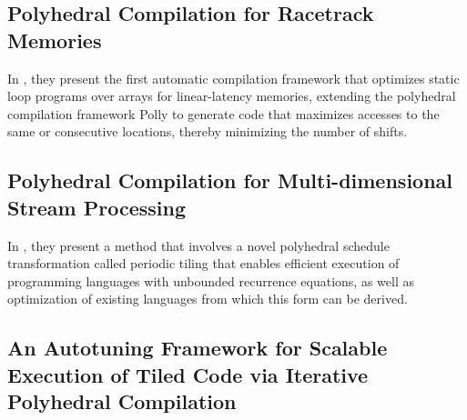 \documentclass[a4paper, 11pt]{article}
\begin{document}
\subsection{Polyhedral Compilation for Racetrack Memories}
In \cite{khan2020polyhedral}, they present the first automatic compilation framework that optimizes static loop programs over arrays for linear-latency memories, extending the polyhedral compilation framework Polly to generate code that maximizes accesses to the same or consecutive locations, thereby minimizing the number of shifts.

\subsection{Polyhedral Compilation for Multi-dimensional Stream Processing}
In \cite{leben2019polyhedral}, they present a method that involves a novel polyhedral schedule transformation called periodic tiling that enables efficient execution of programming languages with unbounded recurrence equations, as well as optimization of existing languages from which this form can be derived.

\subsection{An Autotuning Framework for Scalable Execution of Tiled Code via Iterative Polyhedral Compilation}
\end{document}
